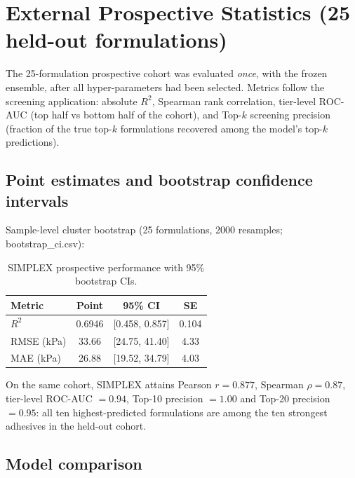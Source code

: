 \documentclass[utf8]{frontiers_suppmat}
\begin{document}
\section{External Prospective Statistics (25 held-out formulations)}

The 25-formulation prospective cohort was evaluated \emph{once}, with the
frozen ensemble, after all hyper-parameters had been selected. Metrics follow
the screening application: absolute $R^2$, Spearman rank correlation,
tier-level ROC-AUC (top half vs bottom half of the cohort), and Top-$k$
screening precision (fraction of the true top-$k$ formulations recovered
among the model's top-$k$ predictions).

\subsection{Point estimates and bootstrap confidence intervals}

Sample-level cluster bootstrap (25 formulations, 2000 resamples;
bootstrap\_ci.csv):

\begin{table}[h]
\centering
\caption{SIMPLEX prospective performance with 95\% bootstrap CIs.}
\label{tab:ext_ci}
\begin{tabular}{lccc}
\toprule
Metric & Point & 95\% CI & SE \\
\midrule
$R^2$ & 0.6946 & [0.458, 0.857] & 0.104 \\
RMSE (kPa) & 33.66 & [24.75, 41.40] & 4.33 \\
MAE (kPa) & 26.88 & [19.52, 34.79] & 4.03 \\
\bottomrule
\end{tabular}
\end{table}

On the same cohort, SIMPLEX attains Pearson $r = 0.877$, Spearman
$\rho = 0.87$, tier-level ROC-AUC $= 0.94$, Top-10 precision $= 1.00$ and
Top-20 precision $= 0.95$: all ten highest-predicted formulations are among
the ten strongest adhesives in the held-out cohort.

\subsection{Model comparison}
\end{document}
